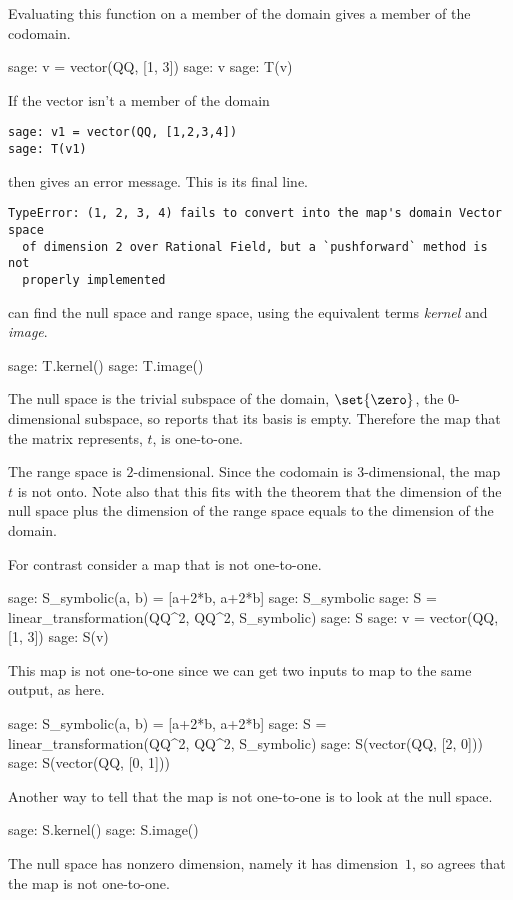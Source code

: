 Evaluating this function on a member of the domain gives a member
of the codomain. 
\begin{sagecommandline}
sage: v = vector(QQ, [1, 3])  
sage: v
sage: T(v)
\end{sagecommandline}

If the vector isn't a member of the domain
\begin{lstlisting}
sage: v1 = vector(QQ, [1,2,3,4])
sage: T(v1)
\end{lstlisting}
then \Sage{} gives an error message.
This is its final line.
\begin{lstlisting}
TypeError: (1, 2, 3, 4) fails to convert into the map's domain Vector space 
  of dimension 2 over Rational Field, but a `pushforward` method is not 
  properly implemented
\end{lstlisting}

\Sage{} can find the null space 
and range space, using the equivalent 
terms \textit{kernel} and \textit{image}.
\begin{sagecommandline}
sage: T.kernel()                                       
sage: T.image()                                        
\end{sagecommandline}
The null space is the trivial subspace of the domain,
$\set{\zero}$, the $0$-dimensional
subspace, so \Sage{} reports that its basis is empty.
Therefore the map that the matrix represents, $t$, is one-to-one.

The range space is $2$-dimensional. 
Since the codomain is $3$-dimensional, the map~$t$ is not onto.
Note also that this fits with the theorem that
the dimension of the null space plus the dimension of the 
range space equals to the dimension of the domain.

For contrast consider a map that is not one-to-one.
\begin{sagecommandline}
sage: S_symbolic(a, b) = [a+2*b, a+2*b]
sage: S_symbolic
sage: S = linear_transformation(QQ^2, QQ^2, S_symbolic)
sage: S
sage: v = vector(QQ, [1, 3])  
sage: S(v)
\end{sagecommandline}
This map is not one-to-one since we can get two inputs
to map to the same output, 
as here.  
\begin{sagecommandline}
sage: S_symbolic(a, b) = [a+2*b, a+2*b]
sage: S = linear_transformation(QQ^2, QQ^2, S_symbolic)
sage: S(vector(QQ, [2, 0]))
sage: S(vector(QQ, [0, 1]))
\end{sagecommandline}
\noindent
Another way to tell that the map is not one-to-one is to look at the 
null space.
\begin{sagecommandline}
sage: S.kernel()
sage: S.image()
\end{sagecommandline}
The null space has nonzero dimension, namely it 
has dimension~$1$,
so \Sage{} agrees that the map is not one-to-one.

